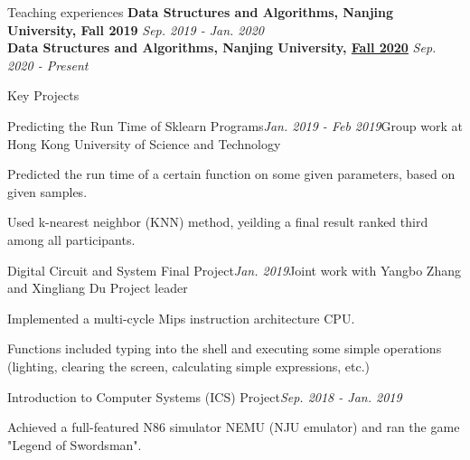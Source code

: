 \documentclass{resume} %
\begin{document}
\begin{rSection}{Teaching experiences}
\textbf{Data Structures and Algorithms, Nanjing University, Fall 2019} \hfill{\em Sep. 2019 - Jan. 2020}\\
\textbf{Data Structures and Algorithms, Nanjing University, \href{https://chaodong.me/teaching/dsalg/2020/course-homepage.html}{Fall 2020}} \hfill{\em Sep. 2020 - Present}\\
\end{rSection}
\begin{rSection}{Key Projects}

\begin{rSubsection}{Predicting the Run Time of Sklearn Programs}{\em Jan. 2019 - Feb 2019}{
{\large Group work at Hong Kong University of Science and Technology}}{}

\item Predicted the run time of a certain function on some given parameters, based on given samples.
\item Used k-nearest neighbor (KNN) method, yeilding a final result ranked third among all participants.
\end{rSubsection}
\begin{rSubsection}{Digital Circuit and System Final Project}{\em Jan. 2019}{Joint work with Yangbo Zhang and Xingliang Du}{ Project leader}
\item Implemented a multi-cycle Mips instruction architecture CPU.
\item Functions included typing into the shell and executing some simple operations (lighting, clearing the screen, calculating simple expressions, etc.)
\end{rSubsection}
\begin{rSubsection}{Introduction to Computer Systems (ICS) Project}{\em Sep. 2018 - Jan. 2019}{}{}
\item Achieved a full-featured N86 simulator NEMU (NJU emulator) and ran the game "Legend of Swordsman".
\end{rSubsection}
\end{rSection}
\end{document}
